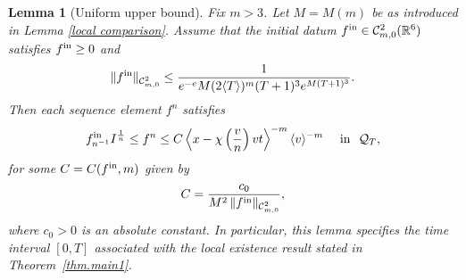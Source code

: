\documentclass[reqno,11pt,final]{amsart}
\theoremstyle{plain}
\newtheorem{lemma}[theorem]{Lemma}
\numberwithin{equation}{section}
\numberwithin{theorem}{section}
\begin{document}
\begin{lemma}[Uniform upper bound]\label{uniform bound} Fix $m>3$. Let $M=M(m)$ be as introduced in Lemma \ref{local comparison}. Assume that the initial datum $f^\textup{in}\in \mathcal{C}^2_{m,0}(\mathbb{R}^6)$ satisfies $f^\textup{in}\ge 0$ and
\begin{align}
    \|f^\textup{in}\|_{\mathcal{C}^2_{m,0}} \le \frac{1}{e^{-e}M(2\langle T\rangle)^m(T+1)^3e^{M(T+1)^3}}. \label{init bd}
\end{align}Then each sequence element $f^n$ satisfies
\begin{align*}
f^\textup{in}_{n^{-1}}I^{\frac{1}{n}}\le f^n \le C \left\langle x - \chi\left(\frac{v}{n}\right)vt\right\rangle^{-m} \langle v\rangle^{-m} \quad \textup{ in } \,\, \mathcal{Q}_T,
\end{align*} for some $C=C(f^\textup{in},m)$ given by
$$
    C = \frac{c_0}{M^2  \,\|f^\textup{in}\|_{\mathcal{C}^2_{m,0}} },
$$where $c_0>0$ is an absolute constant. In particular, this lemma specifies the time interval $[0,T]$ associated with the local existence result stated in Theorem~\ref{thm.main1}.
\end{lemma}
\end{document}
